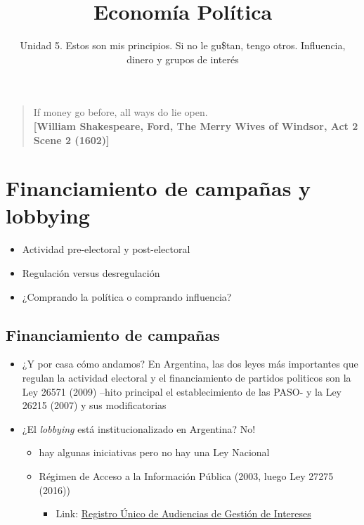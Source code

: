 \documentclass[
  letterpaper,
  DIV=11,
  numbers=noendperiod]{scrartcl}
\title{Economía Política}
\subtitle{Unidad 5. Estos son mis principios. Si no le gu\$tan, tengo
otros. Influencia, dinero y grupos de interés}
\author{}
\date{}
\providecommand{\tightlist}{%
  \setlength{\itemsep}{0pt}\setlength{\parskip}{0pt}}\usepackage{longtable,booktabs,array}
\renewcommand*\contentsname{Table of contents}
\newcommand\contentsname{Table of contents}
\begin{document}
\maketitle

\renewcommand*\contentsname{Table of contents}
{
\hypersetup{linkcolor=}
\setcounter{tocdepth}{2}
\tableofcontents
}

\begin{quote}
If money go before, all ways do lie open.\\
\textbf{{[}William Shakespeare, Ford, The Merry Wives of Windsor, Act 2
Scene 2 (1602){]}}
\end{quote}

\section{\texorpdfstring{\textbf{Financiamiento de campañas y
lobbying}}{Financiamiento de campañas y lobbying}}\label{financiamiento-de-campauxf1as-y-lobbying}

\begin{itemize}
\tightlist
\item
  Actividad pre-electoral y post-electoral
\item
  Regulación versus desregulación
\item
  ¿Comprando la política o comprando influencia?
\end{itemize}

\subsection{Financiamiento de
campañas}\label{financiamiento-de-campauxf1as}

\begin{itemize}
\tightlist
\item
  ¿Y por casa cómo andamos? En Argentina, las dos leyes más importantes
  que regulan la actividad electoral y el financiamiento de partidos
  politicos son la Ley 26571 (2009) --hito principal el establecimiento
  de las PASO- y la Ley 26215 (2007) y sus modificatorias
\item
  ¿El \emph{lobbying} está institucionalizado en Argentina? No!

  \begin{itemize}
  \tightlist
  \item
    hay algunas iniciativas pero no hay una Ley Nacional
  \item
    Régimen de Acceso a la Información Pública (2003, luego Ley 27275
    (2016))

    \begin{itemize}
    \tightlist
    \item
      Link: \href{https://audiencias.mininterior.gob.ar/}{Registro Único
      de Audiencias de Gestión de Intereses}
    \end{itemize}
  \end{itemize}
\end{itemize}
\end{document}
